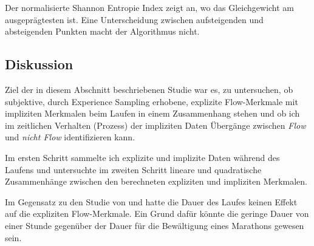 Der normalisierte Shannon Entropie Index zeigt an, wo das Gleichgewicht am ausgeprägtesten ist. Eine Unterscheidung zwischen aufsteigenden und absteigenden Punkten macht der Algorithmus nicht. 

\subsection{Diskussion} 

\label{sub:diskussion}

Ziel der in diesem Abschnitt beschriebenen Studie war es, zu untersuchen, ob subjektive, durch Experience Sampling erhobene, explizite Flow-Merkmale mit impliziten Merkmalen beim Laufen in einem Zusammenhang stehen und ob ich im zeitlichen Verhalten (Prozess) der impliziten Daten Übergänge zwischen \emph{Flow} und \emph{nicht Flow} identifizieren kann. 

Im ersten Schritt sammelte ich explizite und implizite Daten während des Laufens und untersuchte im zweiten Schritt lineare und quadratische Zusammenhänge zwischen den berechneten expliziten und impliziten Merkmalen. 

Im Gegensatz zu den Studie von \citet{Stoll2005} und \citet{Schuler2009} hatte die Dauer des Laufes keinen Effekt auf die expliziten Flow-Merkmale. Ein Grund dafür könnte die geringe Dauer von einer Stunde gegenüber der Dauer für die Bewältigung eines Marathons gewesen sein.

